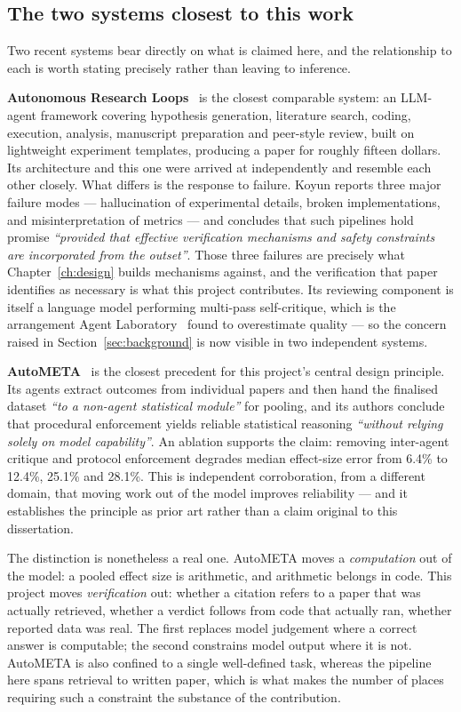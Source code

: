 \subsection{The two systems closest to this work}

Two recent systems bear directly on what is claimed here, and the relationship to each is
worth stating precisely rather than leaving to inference.

\textbf{Autonomous Research Loops}~\cite{koyun2026loops} is the closest comparable system: an
LLM-agent framework covering hypothesis generation, literature search, coding, execution,
analysis, manuscript preparation and peer-style review, built on lightweight experiment
templates, producing a paper for roughly fifteen dollars. Its architecture and this one were
arrived at independently and resemble each other closely. What differs is the response to
failure. Koyun reports three major failure modes --- hallucination of experimental details,
broken implementations, and misinterpretation of metrics --- and concludes that such pipelines
hold promise \emph{``provided that effective verification mechanisms and safety constraints are
incorporated from the outset''}. Those three failures are precisely what
Chapter~\ref{ch:design} builds mechanisms against, and the verification that paper identifies
as necessary is what this project contributes. Its reviewing component is itself a language
model performing multi-pass self-critique, which is the arrangement Agent
Laboratory~\cite{schmidgall2025agentlab} found to overestimate quality --- so the concern
raised in Section~\ref{sec:background} is now visible in two independent systems.

\textbf{AutoMETA}~\cite{lee2026autometa} is the closest precedent for this project's central
design principle. Its agents extract outcomes from individual papers and then hand the
finalised dataset \emph{``to a non-agent statistical module''} for pooling, and its authors
conclude that procedural enforcement yields reliable statistical reasoning \emph{``without
relying solely on model capability''}. An ablation supports the claim: removing inter-agent
critique and protocol enforcement degrades median effect-size error from 6.4\% to 12.4\%,
25.1\% and 28.1\%. This is independent corroboration, from a different domain, that moving
work out of the model improves reliability --- and it establishes the principle as prior art
rather than a claim original to this dissertation.

The distinction is nonetheless a real one. AutoMETA moves a \emph{computation} out of the
model: a pooled effect size is arithmetic, and arithmetic belongs in code. This project moves
\emph{verification} out: whether a citation refers to a paper that was actually retrieved,
whether a verdict follows from code that actually ran, whether reported data was real. The
first replaces model judgement where a correct answer is computable; the second constrains
model output where it is not. AutoMETA is also confined to a single well-defined task, whereas
the pipeline here spans retrieval to written paper, which is what makes the number of places
requiring such a constraint the substance of the contribution.

